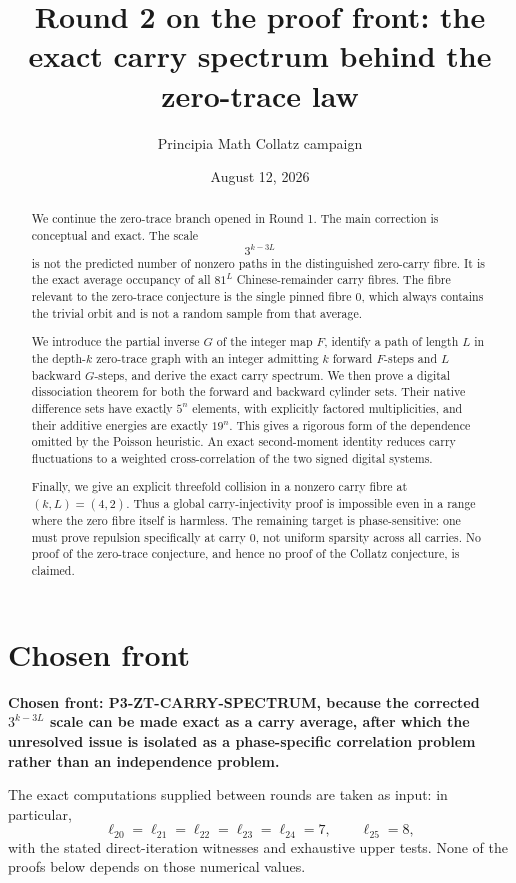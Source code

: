 \documentclass[11pt]{article}
\title{Round 2 on the proof front: the exact carry spectrum behind the zero-trace law}
\author{Principia Math Collatz campaign}
\date{August 12, 2026}
\theoremstyle{remark}
\begin{document}
\maketitle

\begin{abstract}
We continue the zero-trace branch opened in Round 1.  The main correction is conceptual and exact.  The scale
\[
3^{k-3L}
\]
is not the predicted number of nonzero paths in the distinguished zero-carry fibre.  It is the exact average occupancy of all \(81^L\) Chinese-remainder carry fibres.  The fibre relevant to the zero-trace conjecture is the single pinned fibre \(0\), which always contains the trivial orbit and is not a random sample from that average.

We introduce the partial inverse \(G\) of the integer map \(F\), identify a path of length \(L\) in the depth-\(k\) zero-trace graph with an integer admitting \(k\) forward \(F\)-steps and \(L\) backward \(G\)-steps, and derive the exact carry spectrum.  We then prove a digital dissociation theorem for both the forward and backward cylinder sets.  Their native difference sets have exactly \(5^n\) elements, with explicitly factored multiplicities, and their additive energies are exactly \(19^n\).  This gives a rigorous form of the dependence omitted by the Poisson heuristic.  An exact second-moment identity reduces carry fluctuations to a weighted cross-correlation of the two signed digital systems.

Finally, we give an explicit threefold collision in a nonzero carry fibre at \((k,L)=(4,2)\).  Thus a global carry-injectivity proof is impossible even in a range where the zero fibre itself is harmless.  The remaining target is phase-sensitive: one must prove repulsion specifically at carry \(0\), not uniform sparsity across all carries.  No proof of the zero-trace conjecture, and hence no proof of the Collatz conjecture, is claimed.
\end{abstract}

\section{Chosen front}

\textbf{Chosen front: P3-ZT-CARRY-SPECTRUM, because the corrected \(3^{k-3L}\) scale can be made exact as a carry average, after which the unresolved issue is isolated as a phase-specific correlation problem rather than an independence problem.}

The exact computations supplied between rounds are taken as input: in particular,
\[
\ell_{20}=\ell_{21}=\ell_{22}=\ell_{23}=\ell_{24}=7,
\qquad
\ell_{25}=8,
\]
with the stated direct-iteration witnesses and exhaustive upper tests.  None of the proofs below depends on those numerical values.
\end{document}
